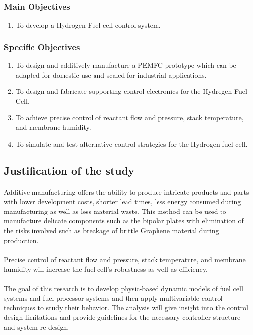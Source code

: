 \subsubsection{Main Objectives}
\begin{enumerate}
\item To develop a Hydrogen Fuel cell control system.
\end{enumerate}
\subsubsection{Specific Objectives}
\begin{enumerate}
\item To design and additively manufacture a PEMFC prototype which can be adapted for domestic use and scaled for industrial applications.
\item To design and fabricate supporting control electronics for the Hydrogen Fuel Cell.
\item To achieve precise control of reactant flow and pressure, stack temperature, and membrane humidity.
\item To simulate and test alternative control strategies for the Hydrogen fuel cell. 
\end{enumerate}
\subsection{Justification of the study}
\paragraph{}Additive manufacturing offers the ability to produce intricate products and parts with lower development costs, shorter lead times, less energy consumed during manufacturing as well as less material waste. This method can be used to manufacture delicate components such as the bipolar plates with elimination of the risks involved such as breakage of brittle Graphene material during production.     
\paragraph{}Precise control of reactant flow and pressure, stack temperature, and membrane humidity will increase the fuel cell’s robustness as well as efficiency.
\paragraph{}The goal of this research is to develop physic-based dynamic models of fuel cell systems and fuel processor systems and then apply multivariable control techniques to study their behavior. The analysis will give insight into the control design limitations and provide guidelines for the necessary controller structure and system re-design.